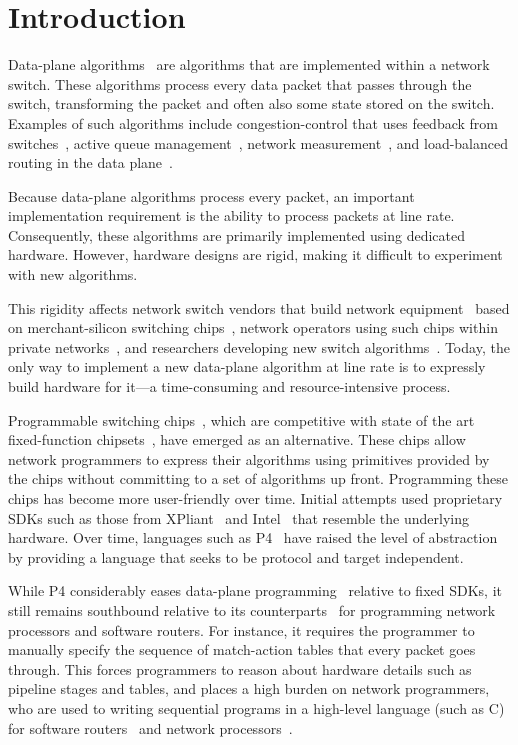 \section{Introduction}
\label{s:intro}

Data-plane algorithms~\cite{cestan} are algorithms that are implemented within
a network switch. These algorithms process every data packet that passes
through the switch, transforming the packet and often also some state stored on
the switch.  Examples of such algorithms include congestion-control that uses
feedback from switches~\cite{xcp, rcp, pdq, dctcp}, active queue
management~\cite{codel}, network measurement~\cite{opensketch, bitmap_george,
elephant_george}, and load-balanced routing in the data plane~\cite{conga}.

Because data-plane algorithms process every packet, an important implementation
requirement is the ability to process packets at line rate.  Consequently,
these algorithms are primarily implemented using dedicated hardware. However,
hardware designs are rigid, making it difficult to experiment with new
algorithms.

This rigidity affects network switch vendors that build network
equipment~\cite{cisco_nexus, dell_force10, arista_7050} based on
merchant-silicon switching chips~\cite{trident, tomahawk, mellanox}, network
operators using such chips within private networks~\cite{google,facebook,vl2},
and researchers developing new switch algorithms~\cite{xcp, codel, d3, detail,
pdq}. Today, the only way to implement a new data-plane algorithm at line rate
is to expressly build hardware for it---a time-consuming and resource-intensive
process.

Programmable switching chips~\cite{flexpipe, xpliant, rmt}, which are competitive
with state of the art fixed-function chipsets~\cite{trident, tomahawk,
mellanox}, have emerged as an alternative.  These chips allow network programmers to
express their algorithms using primitives provided by the chips without
committing to a set of algorithms up front. Programming these
chips has become more user-friendly over time. Initial attempts
used proprietary SDKs such as those from XPliant~\cite{xpliant_sdk,
xpliant_sdk2} and Intel~\cite{intel_sdk} that resemble the underlying hardware.
Over time, languages such as P4~\cite{p4, p4spec} have raised the level of
abstraction by providing a language that seeks to be protocol and target independent.

While P4 considerably eases data-plane programming~\cite{dc_p4} relative to
fixed SDKs, it still remains southbound relative to its
counterparts~\cite{packetc, nova, click} for programming network processors and
software routers. For instance, it requires the programmer to manually specify the sequence of
match-action tables that every packet goes through. This forces programmers to
reason about hardware details such as pipeline stages and tables, and places a high
burden on network programmers, who are used to writing sequential programs in a
high-level language (such as C) for software routers~\cite{click} and network
processors~\cite{ixp4xx, ixp2800}.

